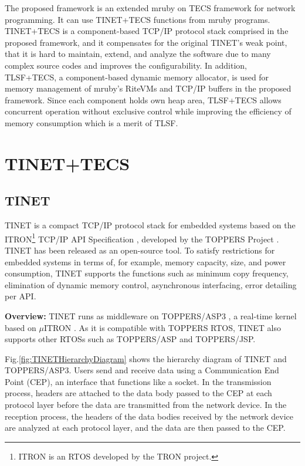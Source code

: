 \documentclass[a4j,12pt,oneside,openany,english]{jsbook}
\begin{document}
The proposed framework is an extended mruby on TECS framework for network programming.
It can use TINET+TECS functions from mruby programs.
TINET+TECS is a component-based TCP/IP protocol stack comprised in the proposed framework, and it compensates for the original TINET's weak point, that it is hard to maintain, extend, and analyze the software due to many complex source codes and improves the configurability.
In addition, TLSF+TECS, a component-based dynamic memory allocator, is used for memory management of mruby's RiteVMs and TCP/IP buffers in the proposed framework.
Since each component holds own heap area, TLSF+TECS allows concurrent operation without exclusive control while improving the efficiency of memory consumption which is a merit of TLSF.


\section{TINET+TECS}
\label{sec:TINET+TECS}

\subsection{TINET}

TINET is a compact TCP/IP protocol stack for embedded systems based on the ITRON\footnote{ITRON is an RTOS developed by the TRON project.} TCP/IP API Specification \cite{url:ITRON_TCP/IP_API_Spec}, developed by the TOPPERS Project \cite{url:TOPPERS}.
TINET has been released as an open-source tool.
To satisfy restrictions for embedded systems in terms of, for example, memory capacity, size, and power consumption, TINET supports the functions such as minimum copy frequency, elimination of dynamic memory control, asynchronous interfacing, error detailing per API.

{\bf Overview:}
TINET runs as middleware on TOPPERS/ASP3 \cite{par:ASP3} \cite{url:ASP3}, a real-time kernel based on $\mu$ITRON \cite{par:microITRON}.
As it is compatible with TOPPERS RTOS, TINET also supports other RTOSs such as TOPPERS/ASP and TOPPERS/JSP.

Fig.\ref{fig:TINETHierarchyDiagram} shows the hierarchy diagram of TINET and TOPPERS/ASP3.
Users send and receive data using a Communication End Point (CEP), an interface that functions like a socket.
In the transmission process, headers are attached to the data body passed to the CEP at each protocol layer before the data are transmitted from the network device.
In the reception process, the headers of the data bodies received by the network device are analyzed at each protocol layer, and the data are then passed to the CEP.
\end{document}
